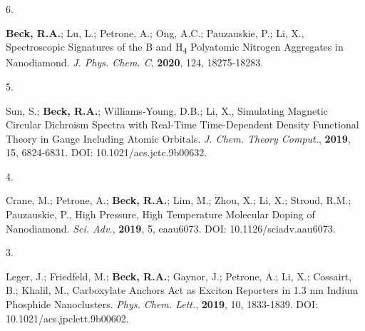 

\begin{cvpublications}


\cvpublication
{6.}
{\parbox[t]{0.95\textwidth}{\strut \textbf{Beck, R.A.}; Lu, L.; Petrone, A.; Ong, A.C.; Pauzauskie, P.; Li, X., 
Spectroscopic Signatures of the B and H\textsubscript{4} Polyatomic Nitrogen Aggregates in Nanodiamond.
\textit{J. Phys. Chem. C}, \textbf{2020}, 124, 18275-18283.
}}




\cvpublication
{5.}
{\parbox[t]{0.95\textwidth}{\strut Sun, S.; \textbf{Beck, R.A.}; Williams-Young, D.B.; Li, X.,
Simulating Magnetic Circular Dichroism Spectra with Real-Time Time-Dependent Density Functional Theory in Gauge Including Atomic Orbitals.
\textit{J. Chem. Theory Comput.}, \textbf{2019}, 15, 6824-6831.
DOI: 10.1021/acs.jctc.9b00632.}}




\cvpublication
{4.}
{\parbox[t]{0.95\textwidth}{\strut Crane, M.; Petrone, A.; \textbf{Beck, R.A.}; Lim, M.; Zhou, X.; Li, X.; Stroud, R.M.; Pauzauskie, P.,
High Pressure, High Temperature Molecular Doping of Nanodiamond.
\textit{Sci. Adv.}, \textbf{2019}, 5, eaau6073.
DOI: 10.1126/sciadv.aau6073.}}




\cvpublication
{3.}
{\parbox[t]{0.95\textwidth}{\strut Leger, J.; Friedfeld, M.; \textbf{Beck, R.A.}; Gaynor, J.; Petrone, A.; Li, X.; Cossairt, B.; Khalil, M., 
Carboxylate Anchors Act as Exciton Reporters in 1.3 nm Indium Phosphide Nanoclusters.
\textit{Phys. Chem. Lett.}, \textbf{2019}, 10, 1833-1839.
DOI: 10.1021/acs.jpclett.9b00602.}}


\end{cvpublications}
